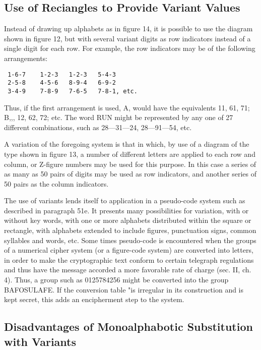 \subsection{Use of Reciangles to Provide Variant Values}

\mypara Instead of drawing up alphabets as in ﬁgure 14, it is possible to use
the diagram shown in ﬁgure 12, but with several variant digits as row
indicators instead of a single digit for each row. For example, the row
indicators may be of the following arrangements:

\begin{verbatim}
 1-6-7    1-2-3   1-2-3   5-4-3
 2-5-8    4-5-6   8-9-4   6-9-2
 3-4-9    7-8-9   7-6-5   7-8-1, etc.
\end{verbatim}

Thus, if the ﬁrst arrangement is used, A, would have the equivalents 11,
61, 71; B,,, 12, 62, 72; etc. The word RUN might be represented by
any one of 27 different combinations, such as 28—31—24, 28—91—54, etc.

\mypara A variation of the foregoing system is that in which, by use of a
diagram of the type shown in ﬁgure 13, a number of different letters are
applied to each row and column, or Z-ﬁgure numbers may be used for
this purpose. In this case a series of as many as 50 pairs of digits may be
used as row indicators, and another series of 50 pairs as the column
indicators.

\mypara The use of variants lends itself to application in a pseudo-code system such as described in paragraph 51e. It presents many possibilities for variation, with or without key words, with one or more alphabets distributed within the square or rectangle, with alphabets extended to include ﬁgures, punctuation signs, common syllables and words, etc. Some
times pseudo-code is encountered when the groups of a numerical cipher
system (or a ﬁgure-code system) are converted into letters, in order to
make the cryptographic text conform to certain telegraph regulations
and thus have the message accorded a more favorable rate of charge (sec.
II, ch. 4). Thus, a group such as 0125784256 might be converted into the
group BAFOSULAFE. If the conversion table "is irregular in its construction and is kept secret, this adds an encipherment step to the system.

\subsection{Disadvantages of Monoalphabotic Substitution with Variants}

